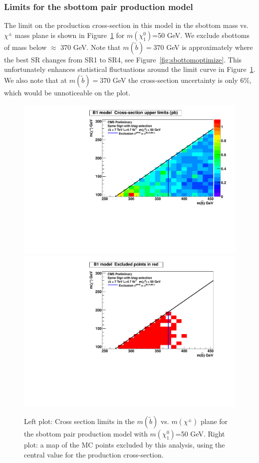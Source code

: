 \subsubsection{Limits for the sbottom pair production model}
\label{sec:sbottompairlimits}
The limit on the production cross-section in this model in the 
sbottom mass vs. $\chi^{\pm}$ mass plane is shown in 
Figure~\ref{fig:sbottomLimit} for 
$m(\chi^0_1)$=50 GeV. We exclude sbottoms of mass below $\approx$ 
370 GeV.  Note that $m(\widetilde{b}) = 370$ GeV is approximately where 
the best SR changes from SR1 to SR4, see Figure~\ref{fig:sbottomoptimize}.
This unfortunately enhances statistical fluctuations around 
the limit curve in Figure~\ref{fig:sbottomLimit}.  We also note that 
at $m(\widetilde{b}) = 370$ GeV the cross-section uncertainty
is only 6\%, which would be unnoticeable on the plot.


\begin{figure}[htb]
\begin{center}
\includegraphics[width=0.48\linewidth]{figs/B1_LimitsOnCarpet.pdf}
\includegraphics[width=0.48\linewidth]{figs/B1_ExcludedRegionMap.pdf}
\caption{Left plot: Cross section limits in the $m(\widetilde{b})$ vs. $m(\chi^{\pm})$ 
plane for the sbottom pair production model with 
$m(\chi^0_1)$=50 GeV.  Right plot: a map of the MC points excluded by this
analysis, using the central value for the production cross-section.
\label{fig:sbottomLimit}}
\end{center}
\end{figure}


